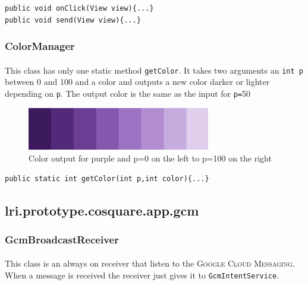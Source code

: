 \documentclass[12pt]{article}
\begin{document}
\begin{verbatim}
public void onClick(View view){...}
public void send(View view){...}
\end{verbatim}
\subsubsection{ColorManager}
\paragraph{}This class has only one static method \verb?getColor?. It takes two arguments an \verb?int p? between 0 and 100 and a color and outputs a new color darker or lighter depending on \verb?p?. The output color is the same as the input for \verb?p=?50

\begin{figure}[ht]
	\centering
		\includegraphics[width=8cm]{pictures/scale.png}
	\caption{Color output for purple and p=0 on the left to p=100 on the right}
	\label{fig:scale}
\end{figure}

\begin{verbatim}
public static int getColor(int p,int color){...}
\end{verbatim}
\subsection{lri.prototype.cosquare.app.gcm}
\subsubsection{GcmBroadcastReceiver}
\paragraph{}This class is an always on receiver that listen to the \textsc{Google Cloud Messaging}. When a message is received the receiver just gives it to \verb?GcmIntentService?.


\end{document}
